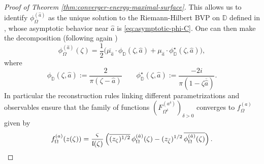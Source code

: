 \documentclass[reqno]{amsart}
\numberwithin{equation}{section}
\theoremstyle{definition}
\theoremstyle{remark}
\begin{document}
\begin{proof}[Proof of Theorem \ref{thm:converger-energy-maximal-surface}]
This allows us to identify $\phi^{(\hat{a})}_\Omega $ as the unique solution to the Riemann-Hilbert BVP on $\mathbb{D}$ defined in \cite[Section 3]{CHI-mixed}, whose asymptotic behavior near $\hat{a}$ is \eqref{eq:asymptotic-phi-C}. One can then make the decomposition (following again \cite[Section 3]{CHI-mixed})
\begin{equation*}
	\phi^{(\hat{a})}_{\Omega}(\zeta)= \frac{1}{2} \Big( \overline{\mu_{\hat{a}}} \cdot \phi_{\mathbb{D}}(\zeta,\hat{a}) + \mu_{\hat{a}} \cdot \phi^\star_{\mathbb{D}}(\zeta,\hat{a}) \Big),
\end{equation*}
where
\begin{equation}\label{eq:basic-fermions-maximal}
	\phi_{\mathbb{D}}(\zeta,\hat{a}):= \frac{2}{\pi(\zeta - \hat{a})}  \qquad \phi^\star_{\mathbb{D}}(\zeta,\hat{a}):= \frac{-2i}{\pi(1-\zeta \overline{\hat{a}})}.
\end{equation}
In particular the reconstruction rules linking different parametrizations and observables ensure that the family of functions $(F^{(a^\delta)}_{\Omega^\delta})_{\delta >0}$ converges to $f^{(a)}_\Omega$ given by
\[
f^{(a)}_{\Omega}(z(\zeta))
=
\frac{\varsigma}{\frak{l}(\zeta)}
\left(
\overline{(z_\zeta)^{1/2}}\,\phi^{(\hat{a})}_{\Omega}(\zeta)
-
(z_{\bar\zeta})^{1/2}\,\overline{\phi^{(\hat{a})}_{\Omega}(\zeta)}
\right).
\]

\medskip


\end{proof}
\end{document}
